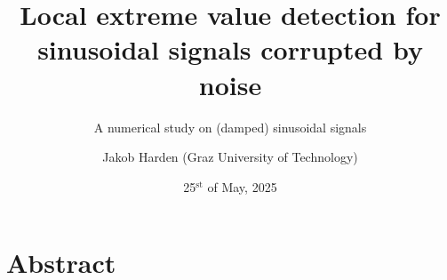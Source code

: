 \documentclass[11pt,aspectratio=169]{beamer}
\def\PresTitle{Local extreme value detection for sinusoidal signals corrupted by noise}
\def\PresSubTitle{A numerical study on (damped) sinusoidal signals}
\def\PresDate{25${}^{\text{st}}$ of May, 2025}
\def\PresAuthorFirstname{Jakob}
\def\PresAuthorLastname{Harden}
\def\PresAuthor{\PresAuthorFirstname{} \PresAuthorLastname{}}
\def\PresAuthorAffiliation{Graz University of Technology}
\begin{document}
	\author{\PresAuthor{} (\PresAuthorAffiliation{})}
	\title{\PresTitle{}}
	\subtitle{\PresSubTitle{}}
	\date{\PresDate{}}
	\begin{frame}[plain]
		\maketitle
	\end{frame}
	\section*{Abstract}
\end{document}
